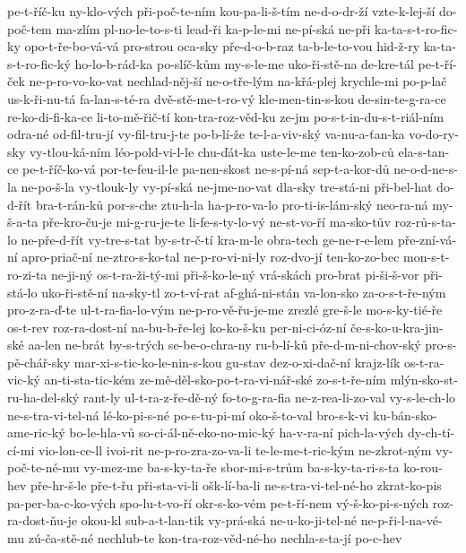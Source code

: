 {pe-t-říč-ku
ny-klo-vých
při-poč-te-ním
kou-pa-li-š-tím
ne-d-o-dr-ží
vzte-k-lej-ší
do-poč-tem
ma-zlím
pl-no-le-to-s-ti
lead-ři
ka-p-le-mi
ne-pí-ská
ne-při
ka-ta-s-t-ro-fic-ky
opo-t-ře-bo-vá-vá
pro-strou
oca-sky
pře-d-o-b-raz
ta-b-le-to-vou
hid-ž-ry
ka-ta-s-t-ro-fic-ký
ho-lo-b-rád-ka
po-slíč-kům
my-s-le-me
uko-ři-stě-na
de-kre-tál
pe-t-ří-ček
ne-p-ro-vo-ko-vat
nechlad-něj-ší
ne-o-tře-lým
na-křá-plej
krychle-mi
po-p-lač
us-k-ři-nu-tá
fa-lan-s-té-ra
dvě-stě-me-t-ro-vý
kle-men-tin-s-kou
de-sin-te-g-ra-ce
re-ko-di-fi-ka-ce
li-to-mě-řič-tí
kon-tra-roz-věd-ku
ze-jm
po-s-t-in-du-s-t-riál-ním
odra-né
od-fil-tru-jí
vy-fil-tru-j-te
po-b-lí-že
te-l-a-viv-ský
va-nu-a-ťan-ka
vo-do-ry-sky
vy-tlou-ká-ním
léo-pold-vi-l-le
chu-ďát-ka
uste-le-me
ten-ko-zob-ců
ela-s-tan-ce
pe-t-říč-ko-vá
por-te-feu-il-le
pa-nen-skost
ne-s-pí-ná
sep-t-a-kor-dů
ne-o-d-ne-s-la
ne-po-š-la
vy-tlouk-ly
vy-pí-ská
ne-jme-no-vat
dla-sky
tre-stá-ni
při-bel-hat
do-d-řít
bra-t-rán-ků
por-s-che
ztu-h-la
ha-p-ro-va-lo
pro-ti-is-lám-ský
neo-ra-ná
my-š-a-ta
pře-kro-ču-je
mi-g-ru-je-te
li-fe-s-ty-lo-vý
ne-st-vo-ří
ma-sko-tův
roz-rů-s-ta-lo
ne-pře-d-řít
vy-tre-s-tat
by-s-tr-č-tí
kra-m-le
obra-tech
ge-ne-r-e-lem
pře-zní-vá-ní
apro-priač-ní
ne-ztro-s-ko-tal
ne-p-ro-vi-ni-ly
roz-dvo-jí
ten-ko-zo-bec
mon-s-t-ro-zi-ta
ne-ji-ný
os-t-ra-ži-tý-mi
při-š-ko-le-ný
vrá-skách
pro-brat
pi-ši-š-vor
při-stá-lo
uko-ři-stě-ní
na-sky-tl
zo-t-ví-rat
af-ghá-ni-stán
va-lon-sko
za-o-s-t-ře-ným
pro-z-ra-ď-te
ul-t-ra-fia-lo-vým
ne-p-ro-vě-řu-je-me
zrezlé
gre-š-le
mo-s-ky-tié-ře
os-t-rev
roz-ra-dost-ní
na-bu-b-ře-lej
ko-ko-š-ku
per-ni-ci-óz-ní
če-s-ko-u-kra-jin-ské
aa-len
ne-brát
by-s-trých
se-be-o-chra-ny
ru-b-lí-ků
pře-d-m-ni-chov-ský
pro-s-pě-chář-sky
mar-xi-s-tic-ko-le-nin-s-kou
gu-stav
dez-o-xi-dač-ní
krajz-lík
os-t-ra-vic-ký
an-ti-sta-tic-kém
ze-mě-děl-sko-po-t-ra-vi-nář-ské
zo-s-t-ře-ním
mlýn-sko-st-ru-ha-del-ský
rant-ly
ul-t-ra-z-ře-dě-ný
fo-to-g-ra-fia
ne-z-rea-li-zo-val
vy-s-le-ch-lo
ne-s-tra-vi-tel-ná
lé-ko-pi-s-né
po-s-tu-pi-mí
oko-š-to-val
bro-s-k-vi
ku-bán-sko-ame-ric-ký
bo-le-hla-vů
so-ci-ál-ně-eko-no-mic-ký
ha-v-ra-ní
pich-la-vých
dy-ch-tí-cí-mi
vio-lon-ce-ll
ivoi-rit
ne-p-ro-zra-zo-va-li
te-le-me-t-ric-kým
ne-zkrot-ným
vy-poč-te-né-mu
vy-mez-me
ba-s-ky-ta-ře
sbor-mi-s-trům
ba-s-ky-ta-ri-s-ta
ko-rou-hev
pře-hr-š-le
pře-t-řu
při-sta-vi-li
ošk-lí-ba-li
ne-s-tra-vi-tel-né-ho
zkrat-ko-pis
pa-per-ba-c-ko-vých
spo-lu-t-vo-ří
okr-s-ko-vém
pe-t-ří-nem
vý-š-ko-pi-s-ných
roz-ra-dost-ňu-je
okou-kl
sub-a-t-lan-tik
vy-prá-ská
ne-u-ko-ji-tel-né
ne-p-ři-l-na-vé-mu
zú-ča-stě-né
nechlub-te
kon-tra-roz-věd-né-ho
nechla-s-ta-jí
po-c-hev
}
